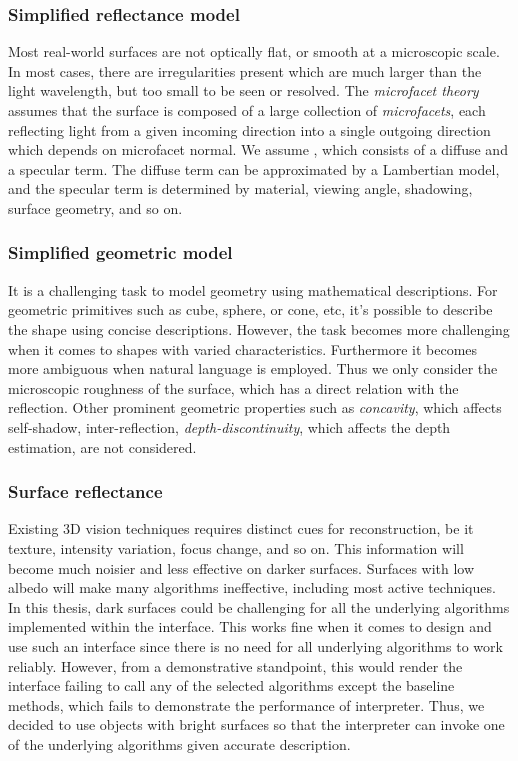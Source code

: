 \subsubsection{Simplified reflectance model}
Most real-world surfaces are not optically flat, or smooth at a microscopic scale. In most cases, there are irregularities present which are much larger than the light wavelength, but too small to be seen or resolved. The \textit{microfacet theory} assumes that the surface is composed of a large collection of \textit{microfacets}, each reflecting light from a given incoming direction into a single outgoing direction which depends on microfacet normal. We assume , which consists of a diffuse and a specular term. The diffuse term can be approximated by a Lambertian model, and the specular term is determined by material, viewing angle, shadowing, surface geometry, and so on.

\subsubsection{Simplified geometric model}
It is a challenging task to model geometry using mathematical descriptions. For geometric primitives such as cube, sphere, or cone, etc, it's possible to describe the shape using concise descriptions. However, the task becomes more challenging when it comes to shapes with varied characteristics. Furthermore it becomes more ambiguous when natural language is employed. Thus we only consider the microscopic roughness of the surface, which has a direct relation with the reflection. Other prominent geometric properties such as \textit{concavity}, which affects self-shadow, inter-reflection, \textit{depth-discontinuity}, which affects the depth estimation, are not considered.

\subsubsection{Surface reflectance}
Existing 3D vision techniques requires distinct cues for reconstruction, be it texture, intensity variation, focus change, and so on. This information will become much noisier and less effective on darker surfaces. Surfaces with low albedo will make many algorithms ineffective, including most active techniques. In this thesis, dark surfaces could be challenging for all the underlying algorithms implemented within the interface. This works fine when it comes to design and use such an interface since there is no need for all underlying algorithms to work reliably. However, from a demonstrative standpoint, this would render the interface failing to call any of the selected algorithms except the baseline methods, which fails to demonstrate the performance of interpreter. Thus, we decided to use objects with bright surfaces so that the interpreter can invoke one of the underlying algorithms given accurate description.

